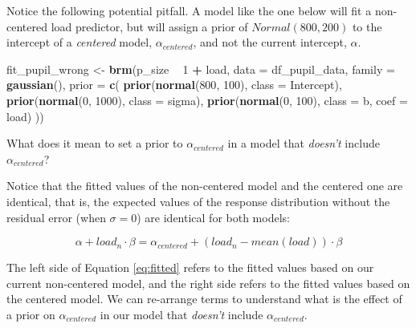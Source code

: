 \documentclass[12pt,]{krantz}
\newenvironment{Shaded}{\begin{snugshade}}{\end{snugshade}}
\newcommand{\DataTypeTok}[1]{\textcolor[rgb]{0.13,0.29,0.53}{#1}}
\newcommand{\DecValTok}[1]{\textcolor[rgb]{0.00,0.00,0.81}{#1}}
\newcommand{\KeywordTok}[1]{\textcolor[rgb]{0.13,0.29,0.53}{\textbf{#1}}}
\newcommand{\NormalTok}[1]{#1}
\newcommand{\OperatorTok}[1]{\textcolor[rgb]{0.81,0.36,0.00}{\textbf{#1}}}
\newcommand{\StringTok}[1]{\textcolor[rgb]{0.31,0.60,0.02}{#1}}
\theoremstyle{definition}
\theoremstyle{definition}
\theoremstyle{definition}
\theoremstyle{remark}
\begin{document}
Notice the following potential pitfall. A model like the one below will fit a non-centered load predictor, but will assign a prior of \(Normal(800,200)\) to the intercept of a \emph{centered} model, \(\alpha_{centered}\), and not the current intercept, \(\alpha\).

\begin{Shaded}
\begin{Highlighting}[]
\NormalTok{fit_pupil_wrong <-}\StringTok{ }\KeywordTok{brm}\NormalTok{(p_size }\OperatorTok{~}\StringTok{ }\DecValTok{1} \OperatorTok{+}\StringTok{ }\NormalTok{load,}
                 \DataTypeTok{data =}\NormalTok{ df_pupil_data,}
                 \DataTypeTok{family =} \KeywordTok{gaussian}\NormalTok{(),}
                 \DataTypeTok{prior =} \KeywordTok{c}\NormalTok{(}
                     \KeywordTok{prior}\NormalTok{(}\KeywordTok{normal}\NormalTok{(}\DecValTok{800}\NormalTok{, }\DecValTok{100}\NormalTok{), }\DataTypeTok{class =}\NormalTok{ Intercept),}
                     \KeywordTok{prior}\NormalTok{(}\KeywordTok{normal}\NormalTok{(}\DecValTok{0}\NormalTok{, }\DecValTok{1000}\NormalTok{), }\DataTypeTok{class =}\NormalTok{ sigma),}
                     \KeywordTok{prior}\NormalTok{(}\KeywordTok{normal}\NormalTok{(}\DecValTok{0}\NormalTok{, }\DecValTok{100}\NormalTok{), }\DataTypeTok{class =}\NormalTok{ b, }\DataTypeTok{coef =}\NormalTok{ load)}
\NormalTok{                 ))}
\end{Highlighting}
\end{Shaded}

What does it mean to set a prior to \(\alpha_{centered}\) in a model that \emph{doesn't} include \(\alpha_{centered}\)?

Notice that the fitted values of the non-centered model and the centered one are identical, that is, the expected values of the response distribution without the residual error (when \(\sigma =0\)) are identical for both models:

\begin{equation}
\alpha + load_n \cdot \beta = \alpha_{centered} + (load_n - mean(load)) \cdot \beta 
\label{eq:fitted}
\end{equation}

The left side of Equation \eqref{eq:fitted} refers to the fitted values based on our current non-centered model, and the right side refers to the fitted values based on the centered model. We can re-arrange terms to understand what is the effect of a prior on \(\alpha_{centered}\) in our model that \emph{doesn't} include \(\alpha_{centered}\).
\end{document}
